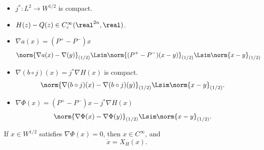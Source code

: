 \documentclass[../main-v2-manifolds.tex]{subfiles}
\begin{document}
\begin{note}[Summary]
    \begin{itemize}
    \item $j^*: L^2\to W^{1/2}$ is compact.
    \item $H(z) - Q(z)\in C_c^\infty(\realtn,\real)$.
    \item $\nabla a(x) = (P^+ - P^-)x$
    \[
        \norm{\nabla a(x) - \nabla (y)}_{(1/2)}\Lsim \norm{(P^+ - P^-)(x-y)}_{(1/2)}\Lsim\norm{x-y}_{(1/2)}
    \]
    \item $\nabla (b\circ j)(x) = j^*\nabla H(x)$ is compact.
    \[
        \norm{\nabla (b\circ j)(x) - \nabla (b\circ j)(y)}_{(1/2)}\Lsim \norm{x-y}_{(1/2)}.
    \]
    \item $\nabla \Phi(x) = (P^+ - P^-)x - j^*\nabla H(x)$
    \[
        \norm{\nabla \Phi(x) - \nabla \Phi(y)}_{(1/2)}\Lsim \norm{x-y}_{(1/2)}.
    \]
\end{itemize}
\end{note}



\begin{wts}\label{thm:critical points phi smooth}
    If $x\in W^{1/2}$ satisfies $\nabla\Phi(x) = 0$, then $x\in C^\infty$, and
    \[
        \mathring{x} = X_H(x).
    \]
\end{wts}
\end{document}
